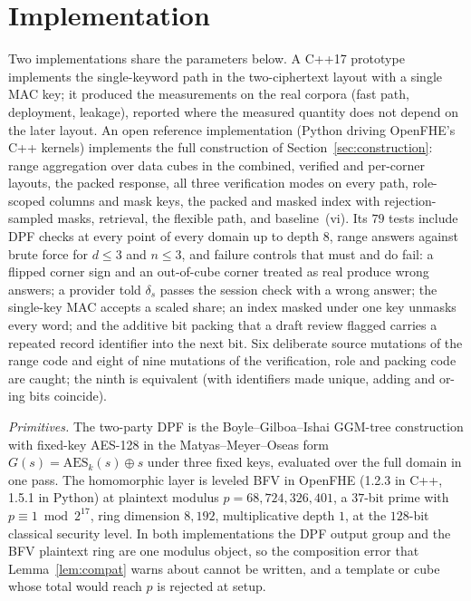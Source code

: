 \documentclass[a4paper,fleqn]{cas-sc}
\begin{document}
\section{Implementation}
\label{sec:impl}
Two implementations share the parameters below. A C++17 prototype implements
the single-keyword path in the two-ciphertext layout with a single MAC key; it
produced the measurements on the real corpora (fast path, deployment, leakage),
reported where the measured quantity does not depend on the later layout.
 An open reference implementation
(Python driving OpenFHE's C++ kernels) implements the full construction of
Section~\ref{sec:construction}: range aggregation over data cubes in the
combined, verified and per-corner layouts, the packed response, all three
verification modes on every path, role-scoped columns and mask keys, the packed
and masked index with rejection-sampled masks, retrieval, the flexible path,
and baseline~(vi). Its $79$ tests include DPF checks at every point of every
domain up to depth $8$, range answers against brute force for $d\le3$ and
$n\le3$, and failure controls that must and do fail: a flipped corner sign and
an out-of-cube corner treated as real produce wrong answers; a provider told
$\delta_s$ passes the session check with a wrong answer; the single-key MAC
accepts a scaled share; an index masked under one key unmasks every word; and
the additive bit packing that a draft review flagged carries a repeated record
identifier into the next bit. Six deliberate source mutations of the range code
and eight of nine mutations of the verification, role and packing code are
caught; the ninth is equivalent (with identifiers made unique, adding and
or-ing bits coincide).

\emph{Primitives.} The two-party DPF is the Boyle--Gilboa--Ishai GGM-tree
construction \citep{boyle2016function} with fixed-key AES-128 in the
Matyas--Meyer--Oseas form $G(s)=\mathrm{AES}_k(s)\oplus s$ under three fixed
keys, evaluated over the full domain in one pass. The homomorphic layer is
leveled BFV in OpenFHE \citep{openfhe} (1.2.3 in C++, 1.5.1 in Python) at
plaintext modulus $p=68{,}724{,}326{,}401$, a $37$-bit prime with $p\equiv1
\bmod 2^{17}$, ring dimension $8{,}192$, multiplicative depth $1$, at the
$128$-bit classical security level. In both implementations the DPF output
group and the BFV plaintext ring are one modulus object, so the composition
error that Lemma~\ref{lem:compat} warns about cannot be written, and a
template or cube whose total would reach $p$ is rejected at setup.
\end{document}
